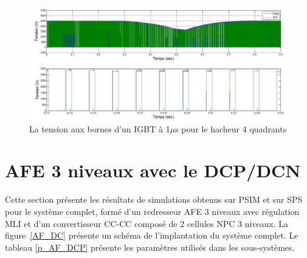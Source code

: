 \documentclass[11pt,letterpaper,final]{report}
\begin{document}
\begin{figure}[htb]
\centering
\includegraphics[scale=0.5]{Fig/Hach_AFE/1u/IGBT_ten_hach.jpg}
\caption{La tension aux bornes d'un IGBT à 1$\mu$s pour le hacheur 4 quadrants}
\label{AF_HA_HAV1}
\end{figure}



\clearpage
\section{AFE 3 niveaux avec le DCP/DCN}
Cette section présente les résultats de simulations obtenus sur PSIM et sur SPS pour le système complet, formé d'un redresseur AFE 3 niveaux avec régulation MLI et d'un convertisseur CC-CC composé de 2 cellules NPC 3 niveaux.  La figure~\ref{AF_DC} présente un schéma de l'implantation du système complet. Le tableau \ref{p_AF_DCP} présente les paramètres utilisés dans les sous-systèmes.
\end{document}
